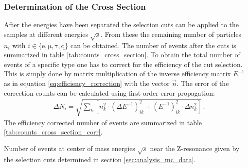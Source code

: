\documentclass[11pt, a4paper]{article}
\numberwithin{equation}{section}
\begin{document}
\subsubsection{Determination of the Cross Section}
\label{sec:determination_cross_section}
After the energies have been separated the selection cuts can be applied to the samples at different energies $\sqrt{s}$.
From these the remaining number of particles $n_i$ with $i \in \{ \mathrm{e}, \mathrm{\mu}, \mathrm{\tau}, \mathrm{q} \}$ can be obtained.
The number of events after the cuts is summarized in table \ref{tab:counts_cross_section}.
To obtain the total number of events of a specific type one has to correct for the efficiency of the cut selection.
This is simply done by matrix multiplication of the inverse efficiency matrix $E^{-1}$ as in equation \eqref{eq:efficiency_correction} with the vector $\vec{n}$.
The error of the correction counts can be calculated using first order error propagation:
\begin{align}
&\Delta N_i = \sqrt{\sum_k \left[ n_k^2 \cdot \left(\Delta E^{-1}\right)_{ik}^2 + \left(E^{-1}\right)_{ik}^2 \cdot \Delta n_k^2 \right]} \,\text{.}
\label{eq:error_prop_matrix_mult}
\end{align}
The efficiency corrected number of events are summarized in table \ref{tab:counts_cross_section_corr}.

\begin{table}
	\begin{subtable}{1.0\textwidth}
		\centering
		
		\label{tab:counts_cross_section}
	\end{subtable}
	
	\vspace{0.5cm}
	
	\begin{subtable}{1.0\textwidth}
		\centering
		
		\label{tab:counts_cross_section_corr}
	\end{subtable}
	\caption{Number of events at center of mass energies $\sqrt{s}$ near the Z-resonance given by the selection cuts determined in section \ref{sec:analysis_mc_data}.}
\end{table}
\end{document}
